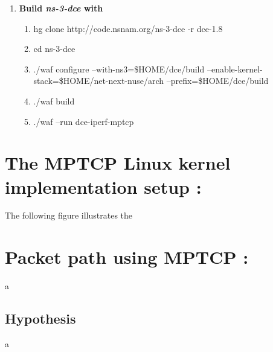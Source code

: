 \documentclass[a4paper,11pt]{article}
\begin{document}
\begin{enumerate}
\begin{enumerate}
					\item \textbf{Build \emph{ns-3-dce } with }
						\begin{enumerate}
						
							\item hg clone http://code.nsnam.org/ns-3-dce  -r dce-1.8
							\item cd ns-3-dce
							\item ./waf configure --with-ns3=\$HOME/dce/build --enable-kernel-stack=\$HOME/net-next-nuse/arch --prefix=\$HOME/dce/build
							\item ./waf build
							\item ./waf --run dce-iperf-mptcp

						\end{enumerate}

					\end{enumerate}

			\end{enumerate}






	\clearpage
	\section{The \emph{$\mathbf{MPTCP}$} Linux kernel implementation setup : }

		\label{sec:mptcplinuximplement}
		\hspace{2cm} The following figure illustrates the 

		
	\clearpage
	\section{Packet path using \emph{$\mathbf{MPTCP}$} :}

		\label{sec:packetpath}
		\vspace{0.5cm}
		\begin{description}
		\item \hspace{2cm} a
		\end{description}
  		
  		\subsection{Hypothesis}

  		 \begin{description}

  		 	\label{subsec:hypothesis}
  			\item \hspace{2cm} a
  			\vspace{1cm}
		\end{description}
			
\end{document}
